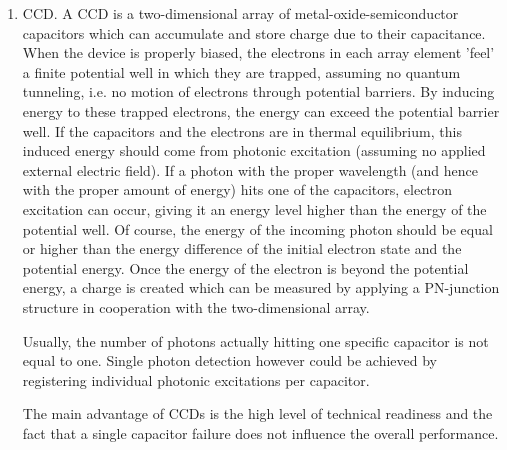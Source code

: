 \begin{enumerate}[i]
	\item \ac{CCD}. A \acs{CCD} is a two-dimensional array of metal-oxide-semiconductor capacitors which can accumulate and store charge due to their capacitance. When the device is properly biased, the electrons in each array element 'feel' a finite potential well in which they are trapped, assuming no quantum tunneling, i.e. no motion of electrons through potential barriers. By inducing energy to these trapped electrons, the energy can exceed the potential barrier well. If the capacitors and the electrons are in thermal equilibrium, this induced energy should come from photonic excitation (assuming no applied external electric field). If a photon with the proper wavelength (and hence with the proper amount of energy) hits one of the capacitors, electron excitation can occur, giving it an energy level higher than the energy of the potential well. Of course, the energy of the incoming photon should be equal or higher than the energy difference of the initial electron state and the potential energy. Once the energy of the electron is beyond the potential energy, a charge is created which can be measured by applying a PN-junction structure in cooperation with the two-dimensional array. 
	
Usually, the number of photons actually hitting one specific capacitor is not equal to one. Single photon detection however could be achieved by registering individual photonic excitations per capacitor. 

The main advantage of \acs{CCD}s is the high level of technical readiness and the fact that a single capacitor failure does not influence the overall performance.


\end{enumerate}
